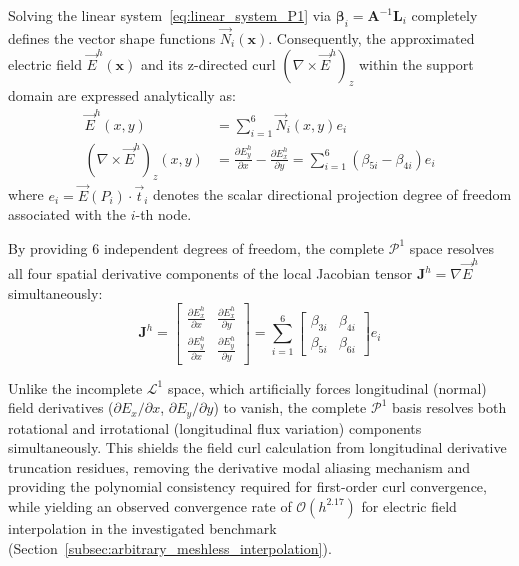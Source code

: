 \documentclass[preprint,12pt]{elsarticle}
\begin{document}
Solving the linear system~\eqref{eq:linear_system_P1} via $\boldsymbol{\beta}_i = \mathbf{A}^{-1} \mathbf{L}_i$ completely defines the vector shape functions $\vec{N}_i(\mathbf{x})$. Consequently, the approximated electric field $\vec{E}^h(\mathbf{x})$ and its z-directed curl $(\nabla \times \vec{E}^h)_z$ within the support domain are expressed analytically as:
\begin{align}
    \vec{E}^h(x, y)                   & = \sum_{i=1}^6 \vec{N}_i(x, y) e_i \label{eq:field_approximation_P1}                                                                                  \\[4pt]
    (\nabla \times \vec{E}^h)_z(x, y) & = \frac{\partial E_y^h}{\partial x} - \frac{\partial E_x^h}{\partial y} = \sum_{i=1}^6 (\beta_{5i} - \beta_{4i}) e_i \label{eq:curl_approximation_P1}
\end{align}
where $e_i = \vec{E}(P_i) \cdot \vec{t}_i$ denotes the scalar directional projection degree of freedom associated with the $i$-th node.

By providing 6 independent degrees of freedom, the complete $\mathcal{P}^1$ space resolves all four spatial derivative components of the local Jacobian tensor $\mathbf{J}^h = \nabla \vec{E}^h$ simultaneously:
\begin{equation}
    \mathbf{J}^h = \begin{bmatrix}
        \frac{\partial E_x^h}{\partial x} & \frac{\partial E_x^h}{\partial y} \\[4pt]
        \frac{\partial E_y^h}{\partial x} & \frac{\partial E_y^h}{\partial y}
    \end{bmatrix} = \sum_{i=1}^6 \begin{bmatrix}
        \beta_{3i} & \beta_{4i} \\[4pt]
        \beta_{5i} & \beta_{6i}
    \end{bmatrix} e_i
    \label{eq:full_jacobian_tensor_P1}
\end{equation}

Unlike the incomplete $\mathcal{L}^1$ space, which artificially forces longitudinal (normal) field derivatives ($\partial E_x/\partial x$, $\partial E_y/\partial y$) to vanish, the complete $\mathcal{P}^1$ basis resolves both rotational and irrotational (longitudinal flux variation) components simultaneously. This shields the field curl calculation from longitudinal derivative truncation residues, removing the derivative modal aliasing mechanism and providing the polynomial consistency required for first-order curl convergence, while yielding an observed convergence rate of $\mathcal{O}(h^{2.17})$ for electric field interpolation in the investigated benchmark (Section~\ref{subsec:arbitrary_meshless_interpolation}).
\end{document}
